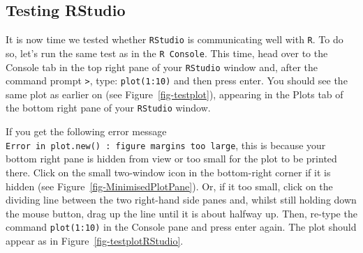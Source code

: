\documentclass[
  letterpaper,
  DIV=11,
  numbers=noendperiod,
  oneside]{scrreprt}
\begin{document}
\subsection{Testing RStudio}\label{testing-rstudio}

It is now time we tested whether \texttt{RStudio} is communicating well
with \texttt{R}. To do so, let's run the same test as in the
\texttt{R\ Console}. This time, head over to the Console tab in the top
right pane of your \texttt{RStudio} window and, after the command prompt
\texttt{\textgreater{}}, type: \texttt{plot(1:10)} and then press enter.
You should see the same plot as earlier on (see
Figure~\ref{fig-testplot}), appearing in the Plots tab of the bottom
right pane of your \texttt{RStudio} window.

If you get the following error message
\texttt{Error\ in\ plot.new()\ :\ figure\ margins\ too\ large}, this is
because your bottom right pane is hidden from view or too small for the
plot to be printed there. Click on the small two-window icon in the
bottom-right corner if it is hidden (see
Figure~\ref{fig-MinimisedPlotPane}). Or, if it too small, click on the
dividing line between the two right-hand side panes and, whilst still
holding down the mouse button, drag up the line until it is about
halfway up. Then, re-type the command \texttt{plot(1:10)} in the Console
pane and press enter again. The plot should appear as in
Figure~\ref{fig-testplotRStudio}.
\end{document}
